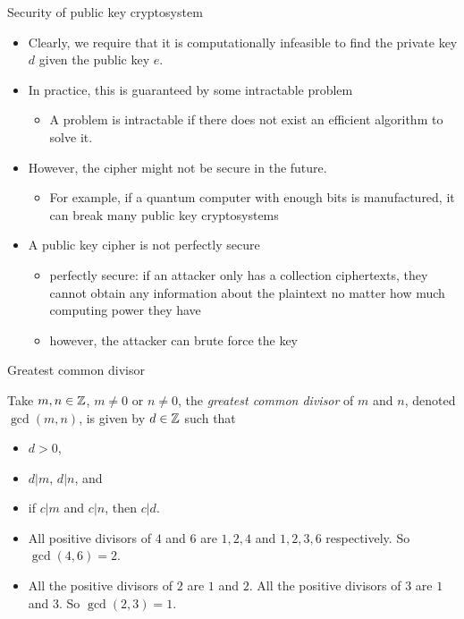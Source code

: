 \begin{frame}{Security of public key cryptosystem}
    \begin{itemize}
        \item Clearly, we require that it is computationally infeasible to find the private key $d$ given the public key $e$.
         \item In practice, this is guaranteed by some intractable problem
         \begin{itemize}
             \item A problem is intractable if there does not exist an efficient algorithm to solve it.
         \end{itemize}
        \item However, the cipher might not be secure in the future.
        \begin{itemize}
            \item For example, if a quantum computer with enough bits is manufactured, it can break many public key cryptosystems
        \end{itemize}
       \item A public key cipher is not perfectly secure 
       \begin{itemize}
           \item perfectly secure: if an attacker only has a collection ciphertexts, they cannot obtain any information about the plaintext no matter how much computing power they have
           \item however, the attacker can brute force the key
       \end{itemize}
    \end{itemize}
\end{frame}

\begin{frame}{Greatest common divisor}
\begin{definition}
Take $m,n\in{\mathbb Z}$, $m\neq 0$ or $n\neq 0$, the \textit{greatest common divisor} of $m$ and $n$, denoted $\gcd (m,n)$, is given by $d\in{\mathbb Z}$ such that
    \begin{itemize}
        \item $d>0$,
        \item $d|m$, $d|n$, and
        \item if $c|m$ and $c|n$, then $c|d$.
\end{itemize}
\end{definition}
\begin{example}
\begin{itemize}
    \item All positive divisors of $4$ and $6$ are $1,2,4$ and $1,2,3,6$ respectively.
So $\gcd(4,6)=2$.
\item All the positive divisors of $2$ are $1$ and $2$.
All the positive divisors of $3$ are $1$ and $3$.
So $\gcd(2,3)=1$.
\end{itemize}
\end{example}
\end{frame}

